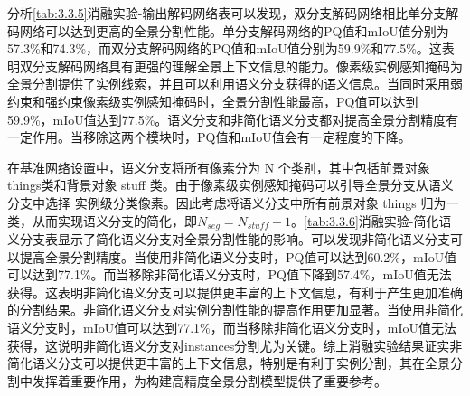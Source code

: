 分析\cref*{tab:3.3.5}消融实验-输出解码网络表可以发现，双分支解码网络相比单分支解码网络可以达到更高的全景分割性能。单分支解码网络的PQ值和mIoU值分别为57.3\%和74.3\%，而双分支解码网络的PQ值和mIoU值分别为59.9\%和77.5\%。这表明双分支解码网络具有更强的理解全景上下文信息的能力。像素级实例感知掩码为全景分割提供了实例线索，并且可以利用语义分支获得的语义信息。当同时采用弱约束和强约束像素级实例感知掩码时，全景分割性能最高，PQ值可以达到59.9\%，mIoU值达到77.5\%。语义分支和非简化语义分支都对提高全景分割精度有一定作用。当移除这两个模块时，PQ值和mIoU值会有一定程度的下降。


在基准网络设置中，语义分支将所有像素分为 N 个类别，其中包括前景对象 things类和背景对象 stuff 类。由于像素级实例感知掩码可以引导全景分支从语义分支中选择
实例级分类像素。因此考虑将语义分支中所有前景对象 things 归为一类，从而实现语义分支的简化，即$N_{seg}=N_{stuff}+1$。\cref*{tab:3.3.6}消融实验-简化语义分支表显示了简化语义分支对全景分割性能的影响。可以发现非简化语义分支可以提高全景分割精度。当使用非简化语义分支时，PQ值可以达到60.2\%，mIoU值可以达到77.1\%。而当移除非简化语义分支时，PQ值下降到57.4\%，mIoU值无法获得。这表明非简化语义分支可以提供更丰富的上下文信息，有利于产生更加准确的分割结果。非简化语义分支对实例分割性能的提高作用更加显著。当使用非简化语义分支时，mIoU值可以达到77.1\%，而当移除非简化语义分支时，mIoU值无法获得，这说明非简化语义分支对instances分割尤为关键。综上消融实验结果证实非简化语义分支可以提供更丰富的上下文信息，特别是有利于实例分割，其在全景分割中发挥着重要作用，为构建高精度全景分割模型提供了重要参考。

